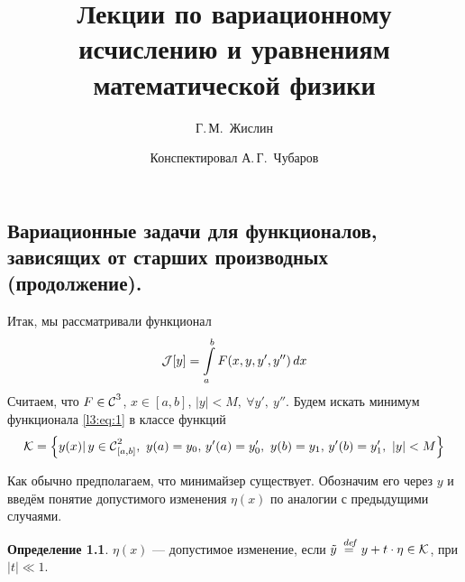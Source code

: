 \documentclass[12pt,a4paper,openany,fleqn]{book}
\newcommand {\defeq}{\stackrel{\hspace{0.09 cm}de\!f}{=}}
\newcommand {\eqdef}{\defeq}
\newcommand{\Cf}{\ensuremath{\mathcal{C}}}
\newcommand{\J}{\ensuremath{\mathcal{J}}}
\newcommand{\mc}[1]{\ensuremath{\mathcal{#1}}}
\newcommand{\Cfn}[2][]{\ensuremath{\Cf{\mathstrut}^{#2}_{#1}}}
\newcommand{\K}{\mc{K}}
\theoremstyle{definition}
\newtheorem{_def}{Определение}[section]
\begin{document}
	\author{Г.\,М.~Жислин}
	\title{Лекции по вариационному исчислению и уравнениям математической физики}
	\date{Конспектировал А.\,Г.~Чубаров}
	
	
	
	\maketitle
	
	
	\renewcommand{\thepart}{\Asbuk{part}}
	\renewcommand{\thechapter}{\arabic{chapter}}
	\renewcommand{\thesection}{\arabic{section}}
	\renewcommand{\thesubsection}{\Roman{subsection}}
	\renewcommand{\thefootnote}{\roman{footnote}}
	\renewcommand{\phi}{\varphi}
	
	\setcounter{chapter}{2}
	\chapter{}
	\label{lecture3}
	\section[Задачи для функционалов, зависящих от старших производных (продолжение).]{Вариационные задачи для функционалов, зависящих от старших производных (продолжение).}
	\label{lecture3section1}
	
	Итак, мы рассматривали функционал 
	\begin{equation}
		\label{l3:eq:1}
		\hfill\J[y]=\int\limits_a^b F(x,y,y',y'')\,dx\hfill
	\end{equation}
	Считаем, что $F\in\Cfn{3}$, $x\in[a,b]$, $|y|<M,\ \forall y',\ y''$. 
	Будем искать минимум функционала \eqref{l3:eq:1} в классе функций
	\begin{equation*}
		\K=\left\{y(x)|\,y\in\Cfn[{[a,b]}]{2},\ y(a)=y_0,\,y'(a)=y'_0,\ y(b)=y_1,\,y'(b)=y'_1,\ |y|<M\right\}
	\end{equation*}
	
	Как обычно предполагаем, что минимайзер существует. Обозначим его через $y$ и введём понятие допустимого изменения $\eta(x)$ по аналогии с предыдущими случаями.
	\begin{_def}
		$\eta(x)$ --- допустимое изменение, если $\tilde{y}\eqdef y+t\cdot\eta\in\K$, при $|t|\ll1$.
	\end{_def} 
\end{document}
